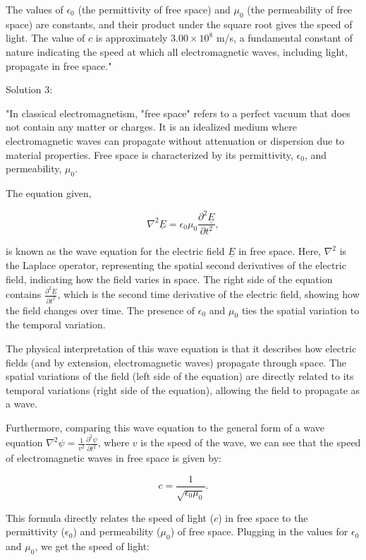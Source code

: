 The values of \(\epsilon_{0}\) (the permittivity of free space) and \(\mu_{0}\) (the permeability of free space) are constants, and their product under the square root gives the speed of light. The value of \(c\) is approximately \(3.00 \times 10^8\) m/s, a fundamental constant of nature indicating the speed at which all electromagnetic waves, including light, propagate in free space."

Solution 3: 

"In classical electromagnetism, "free space" refers to a perfect vacuum that does not contain any matter or charges. It is an idealized medium where electromagnetic waves can propagate without attenuation or dispersion due to material properties. Free space is characterized by its permittivity, \(\epsilon_0\), and permeability, \(\mu_0\).

The equation given,

\[
\nabla^{2}\underline{E} =  \epsilon_{0}\mu_{0}\frac{\partial^2 \underline{E}}{\partial t^{2}},
\]

is known as the wave equation for the electric field \(\underline{E}\) in free space. Here, \(\nabla^{2}\) is the Laplace operator, representing the spatial second derivatives of the electric field, indicating how the field varies in space. The right side of the equation contains \(\frac{\partial^2 \underline{E}}{\partial t^{2}}\), which is the second time derivative of the electric field, showing how the field changes over time. The presence of \(\epsilon_0\) and \(\mu_0\) ties the spatial variation to the temporal variation.

The physical interpretation of this wave equation is that it describes how electric fields (and by extension, electromagnetic waves) propagate through space. The spatial variations of the field (left side of the equation) are directly related to its temporal variations (right side of the equation), allowing the field to propagate as a wave.

Furthermore, comparing this wave equation to the general form of a wave equation \(\nabla^{2}\psi = \frac{1}{v^2}\frac{\partial^2 \psi}{\partial t^{2}}\), where \(v\) is the speed of the wave, we can see that the speed of electromagnetic waves in free space is given by:

\[
c = \frac{1}{\sqrt{\epsilon_0\mu_0}}.
\]

This formula directly relates the speed of light (\(c\)) in free space to the permittivity (\(\epsilon_0\)) and permeability (\(\mu_0\)) of free space. Plugging in the values for \(\epsilon_0\) and \(\mu_0\), we get the speed of light:

